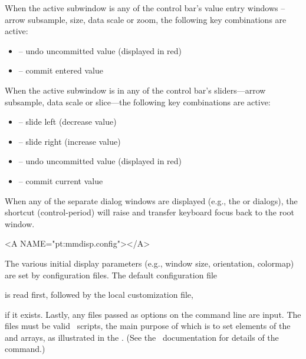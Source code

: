 When the active subwindow is any of the control bar's value entry
windows -- arrow subsample, size, data scale or zoom, the following key
combinations are active:
\begin{itemize}
\item {} -- undo uncommitted value (displayed in red)
\item {} -- commit entered value
\end{itemize}

When the active subwindow is in any of the control bar's sliders---arrow
subsample, data scale or slice---the following key combinations are
active:
\begin{itemize}
\item {} -- slide left (decrease value)
\item {} -- slide right (increase value)
\item {} -- undo uncommitted value (displayed in red)
\item {} -- commit current value
\end{itemize}

When any of the separate dialog windows are displayed (e.g., the
 or 
dialogs), the shortcut  (control-period) will raise and
transfer keyboard focus back to the root  window.

\begin{rawhtml}
<A NAME="pt:mmdisp.config"></A>
\end{rawhtml}
The various initial display parameters (e.g., window size, orientation,
colormap) are set by configuration files.  The default configuration
file
\begin{quote}
\end{quote}
is read first, followed by the local customization file,
\begin{quote}
\end{quote}
if it exists.  Lastly, any files passed as  options on the
command line are input.  The files must be valid \Tcl\ scripts, the main
purpose of which is to set elements of the  and
 arrays, as illustrated in the .
(See the \Tcl\ documentation for details of the  command.)

